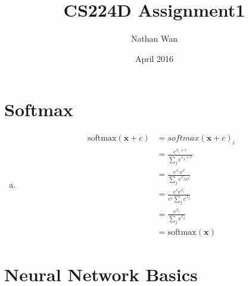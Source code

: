 \documentclass{article}
\title{CS224D Assignment1}
\author{Nathan Wan}
\date{April 2016}
\begin{document}
\maketitle


\section{Softmax}

\begin{enumerate}[(a)]
\item \begin{align*} 
\mathrm{softmax}(\mathbf{x}+c) &= softmax(\mathbf{x}+c)_i \\
&= \frac{e^{x_i+c}}{\sum_j{e^{x_j+c}}} \\
&= \frac{e^{x_i}e^{c}}{\sum_j{e^{x_j}e^{c}}} \\
&= \frac{e^{c}e^{x_i}}{e^{c}\sum_j{e^{x_j}}} \\
&= \frac{e^{x_i}}{\sum_j{e^{x_j}}} \\
&= \mathrm{softmax}(\mathbf{x}) 
\end{align*}

\end{enumerate}


\section{Neural Network Basics}
\end{document}
